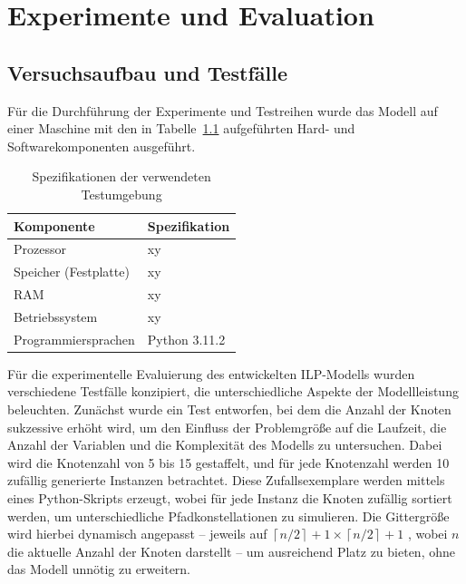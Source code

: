 \documentclass[bachelor, german]{algothesis}
\begin{document}
\chapter{Experimente und Evaluation}
\section{Versuchsaufbau und Testfälle}
Für die Durchführung der Experimente und Testreihen wurde das Modell auf einer Maschine mit den in Tabelle~\ref{tab:spezifikationen} aufgeführten Hard- und Softwarekomponenten ausgeführt.
\begin{table}[H]
    \centering
    \begin{tabular}{|l|l|}
        \hline
        \textbf{Komponente}         & \textbf{Spezifikation} \\
        \hline
        Prozessor                   & xy     \\
        \hline
        Speicher (Festplatte)       & xy        \\
        \hline
        RAM                         & xy            \\
        \hline
        Betriebssystem              & xy       \\
        \hline
        Programmiersprachen         & Python 3.11.2          \\
        \hline
    \end{tabular}
    \caption{Spezifikationen der verwendeten Testumgebung}
    \label{tab:spezifikationen}
\end{table}
Für die experimentelle Evaluierung des entwickelten ILP-Modells wurden verschiedene Testfälle konzipiert, die unterschiedliche Aspekte der Modellleistung beleuchten. Zunächst wurde ein Test entworfen, bei dem die Anzahl der Knoten sukzessive erhöht wird, um den Einfluss der Problemgröße auf die Laufzeit, die Anzahl der Variablen und die Komplexität des Modells zu untersuchen. Dabei wird die Knotenzahl von 5 bis 15 gestaffelt, und für jede Knotenzahl werden 10 zufällig generierte Instanzen betrachtet. Diese Zufallsexemplare werden mittels eines Python-Skripts erzeugt, wobei für jede Instanz die Knoten zufällig sortiert werden, um unterschiedliche Pfadkonstellationen zu simulieren. Die Gittergröße wird hierbei dynamisch angepasst – jeweils auf $\left\lceil n/2 \right\rceil+1 \times \left\lceil n/2 \right\rceil+1$ , wobei $n$ die aktuelle Anzahl der Knoten darstellt – um ausreichend Platz zu bieten, ohne das Modell unnötig zu erweitern.\newline
\end{document}
